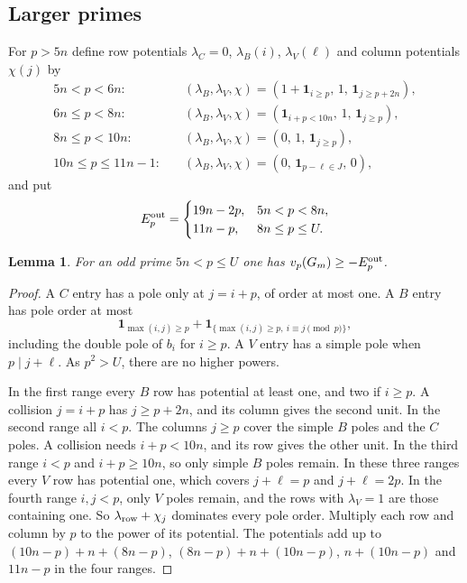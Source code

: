 \documentclass{amsart}
\newtheorem{lemma}{Lemma}[section]
\numberwithin{equation}{section}
\numberwithin{table}{section}
\begin{document}
\subsection{Larger primes}
For $p>5n$ define row potentials $\lambda_C=0$, $\lambda_B(i)$,
$\lambda_V(\ell)$ and column potentials $\chi(j)$ by
\begin{equation*}
\begin{aligned}
5n<p<6n:&\quad
 (\lambda_B,\lambda_V,\chi)
 =(1+\mathbf1_{i\ge p},\,1,\,\mathbf1_{j\ge p+2n}),\\
6n\le p<8n:&\quad
 (\lambda_B,\lambda_V,\chi)
 =(\mathbf1_{i+p<10n},\,1,\,\mathbf1_{j\ge p}),\\
8n\le p<10n:&\quad
 (\lambda_B,\lambda_V,\chi)=(0,\,1,\,\mathbf1_{j\ge p}),\\
10n\le p\le11n-1:&\quad
 (\lambda_B,\lambda_V,\chi)=(0,\,\mathbf1_{p-\ell\in J},\,0),
\end{aligned}
\end{equation*}
and put
\begin{equation*}
 E_p^{\rm out}=
 \begin{cases}
 19n-2p,&5n<p<8n,\\
 11n-p,&8n\le p\le U.
 \end{cases}
\end{equation*}

\begin{lemma}\label{lem:outer-bound}
For an odd prime $5n<p\le U$ one has $v_p(G_m)\ge-E_p^{\rm out}$.
\end{lemma}
\begin{proof}
A $C$ entry has a pole only at $j=i+p$, of order at most one. A $B$ entry
has pole order at most
\[
 \mathbf1_{\max(i,j)\ge p}
 +\mathbf1_{\{\max(i,j)\ge p,\ i\equiv j\pmod p\}},
\]
including the double pole of $b_i$ for $i\ge p$. A $V$ entry has a simple
pole when $p\mid j+\ell$. As $p^2>U$, there are no higher powers.

In the first range every $B$ row has potential at least one, and two if
$i\ge p$. A collision $j=i+p$ has $j\ge p+2n$, and its column gives the
second unit. In the second range all $i<p$. The columns $j\ge p$ cover the
simple $B$ poles and the $C$ poles. A collision needs $i+p<10n$, and its
row gives the other unit. In the third range $i<p$ and $i+p\ge10n$, so
only simple $B$ poles remain. In these three ranges every $V$ row has
potential one, which covers $j+\ell=p$ and $j+\ell=2p$. In the fourth range
$i,j<p$, only $V$ poles remain, and the rows with $\lambda_V=1$ are those
containing one. So $\lambda_{\rm row}+\chi_j$ dominates every pole order.
Multiply each row and column by $p$ to the power of its potential. The
potentials add up to $(10n-p)+n+(8n-p)$, $(8n-p)+n+(10n-p)$, $n+(10n-p)$
and $11n-p$ in the four ranges.
\end{proof}
\end{document}
